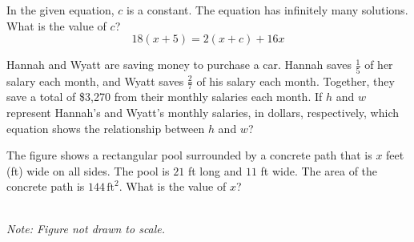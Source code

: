 \noindent\markforreview
\vspace{1em}

In the given equation, \(c\) is a constant. The equation has infinitely many solutions. What is the value of \(c\)?
\[
18(x+5)=2(x+c)+16x
\]

\vspace{0.75em}


\vspace{2em}
\noindent\markforreview
\vspace{1em}

Hannah and Wyatt are saving money to purchase a car. Hannah saves \(\frac{1}{5}\) of her salary each month, and Wyatt saves \(\frac{2}{7}\) of his salary each month. Together, they save a total of \$3{,}270 from their monthly salaries each month. If \(h\) and \(w\) represent Hannah's and Wyatt's monthly salaries, in dollars, respectively, which equation shows the relationship between \(h\) and \(w\)?

\vspace{0.75em}


\newpage
\noindent\markforreview
\vspace{1em}

The figure shows a rectangular pool surrounded by a concrete path that is \(x\) feet (ft) wide on all sides. The pool is \(21\) ft long and \(11\) ft wide. The area of the concrete path is \(144\,\text{ft}^2\). What is the value of \(x\)?

\begin{center}
\\[0.2em]
\textit{Note: Figure not drawn to scale.}
\end{center}

\vspace{0.5em}

